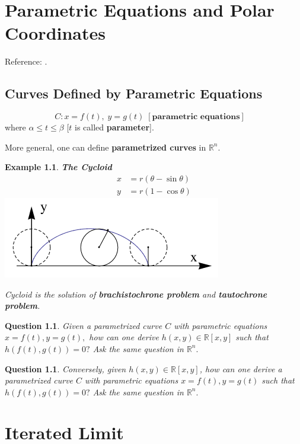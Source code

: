 \documentclass{book}
\newtheorem{eg}[defi]{Example}
\newtheorem{q}[defi]{Question}
\numberwithin{equation}{section}
\begin{document}
\chapter{Parametric Equations and Polar Coordinates}
Reference: \cite[Chapter 10]{S}.
\section{Curves Defined by Parametric Equations}
$$
C: x=f(t), \; y=g(t) \; [\textbf{parametric equations}] \quad
$$ where $\alpha\leq t\leq \beta$ [$t$ is called \textbf{parameter}]. \medskip

More general, one can define \textbf{parametrized curves} in $\mathbb{R}^n.$
\begin{eg}
 \textbf{The Cycloid}
 $$
 \begin{aligned}
 x&=r(\theta-\sin{\theta}) \\
  y&=r(1-\cos{\theta})
 \end{aligned}
 $$
 \includegraphics[scale=0.6]{cycloid.png} \medskip
 
 Cycloid is the solution of \textbf{brachistochrone problem} and \textbf{tautochrone problem}.
\end{eg}

\begin{q}
Given a parametrized curve $C$ with parametric equations $x=f(t), y=g(t),$ how can one derive $h(x,y)\in \mathbb{R}[x,y]$ such that $h(f(t),g(t))=0?$ Ask the same question in $\mathbb{R}^n.$
\end{q}

\begin{q}
Conversely, given $h(x,y)\in \mathbb{R}[x,y]$, how can one derive a parametrized curve $C$ with parametric equations $x=f(t), y=g(t)$ such that $h(f(t),g(t))=0 ?$ Ask the same question in $\mathbb{R}^n.$
\end{q}



\chapter{Iterated Limit}
\end{document}
